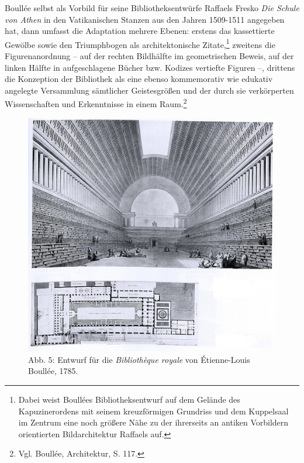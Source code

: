 Boullée selbst als Vorbild für seine Bibliotheksentwürfe Raffaels Fresko
\emph{Die Schule von Athen} in den Vatikanischen Stanzen aus den Jahren
1509-1511 angegeben hat, dann umfasst die Adaptation mehrere Ebenen:
erstens das kassettierte Gewölbe sowie den Triumphbogen als
architektonische Zitate,\footnote{Dabei weist Boullées
  Bibliotheksentwurf auf dem Gelände des Kapuzinerordens mit seinem
  kreuzförmigen Grundriss und dem Kuppelsaal im Zentrum eine noch
  größere Nähe zu der ihrerseits an antiken Vorbildern orientierten
  Bildarchitektur Raffaels auf.} zweitens die Figurenanordnung -- auf
der rechten Bildhälfte im geometrischen Beweis, auf der linken Hälfte in
aufgeschlagene Bücher bzw. Kodizes vertiefte Figuren --, drittens die
Konzeption der Bibliothek als eine ebenso kommemorativ wie edukativ
angelegte Versammlung sämtlicher Geistesgrößen und der durch sie
verkörperten Wissenschaften und Erkenntnisse in einem Raum.\footnote{Vgl.
  Boullée, Architektur, S. 117.}

\begin{figure}[htbp]
\centering
\includegraphics{img/wagner-5.jpg}
\caption{Abb. 5: Entwurf für die \emph{Bibliothèque royale} von
Étienne-Louis Boullée, 1785.}
\end{figure}

